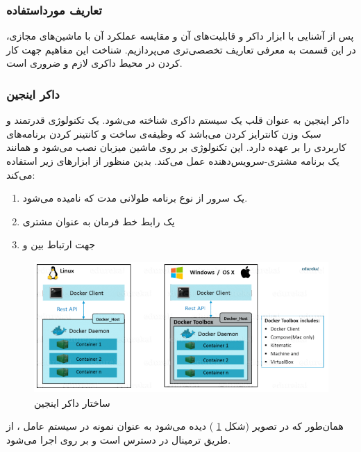 \subsubsection{تعاریف مورداستفاده}

پس از آشنایی با ابزار داکر و قابلیت‌های آن و مقایسه عملکرد آن با ماشین‌های مجازی، در این قسمت به معرفی تعاریف تخصصی‌تری می‌پردازیم. شناخت این مفاهیم جهت کار کردن در محیط داکری لازم و ضروری است.

\subsubsection*{داکر اینجین}
داکر اینجین به عنوان قلب یک سیستم داکری شناخته می‌شود. یک تکنولوژی قدرتمند و سبک وزن کانترایز کردن  می‌باشد که وظیفه‌ی ساخت و کانتینر کردن برنامه‌های کاربردی را بر عهده دارد. این تکنولوژی بر روی ماشین میزبان نصب می‌شود و همانند یک برنامه مشتری-سرویس‌دهنده عمل می‌کند. بدین منظور از ابزارهای زیر استفاده می‌کند:
\begin{enumerate}
	\item 
	یک سرور از نوع برنامه طولانی مدت  که
	نامیده می‌شود.
	\item 
	یک رابط خط فرمان به عنوان مشتری
	
	\item 
	جهت ارتباط بین
	و
	
\end{enumerate}

\begin{figure}[!h]
	\centering
	\includegraphics[height=5cm]{fig2-5}
	\caption{ساختار داکر اینجین}
	\label{تصویر 2-5}
\end{figure}

همان‌طور که در تصویر (شکل 
\ref{تصویر 2-5}
) دیده می‌شود به عنوان نمونه در سیستم عامل
،
از طریق ترمینال در دسترس است و
بر روی
اجرا می‌شود. 


